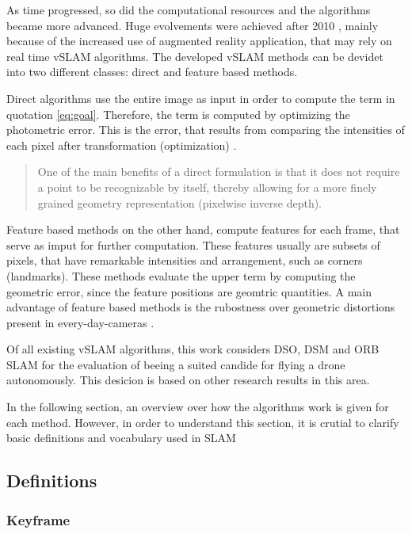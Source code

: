 As time progressed, so did the computational resources and the algorithms became more advanced. Huge evolvements were achieved after 2010 \cite{evolved}, mainly because of the increased
use of augmented reality application, that may rely on real time vSLAM algorithms. The developed vSLAM methods can be devidet into two different classes: direct and feature based methods.

Direct algorithms use the entire image as input in order to compute the term in quotation \ref{eq:goal}. Therefore, the term is computed by optimizing the photometric error. 
This is the error, that results from comparing the intensities of each pixel after transformation (optimization) \cite{dso}. 

  \begin{quote}
	One of the main benefits of a direct formulation is that it
	does not require a point to be recognizable by itself, thereby
	allowing for a more finely grained geometry representation (pixelwise inverse depth). \cite{dso}
  \end{quote}

Feature based methods on the other hand, compute features for each frame, that serve as imput for further computation. These features usually are subsets of pixels, that have remarkable 
intensities and arrangement, such as corners (landmarks). These methods evaluate the upper term by computing the geometric error, since the feature positions are geomtric 
quantities. A main advantage of feature based methods is the rubostness over geometric distortions present in every-day-cameras \cite{dso}. 

Of all existing vSLAM algorithms, this work considers DSO, DSM and ORB SLAM for the evaluation of beeing a suited candide for flying a drone autonomously. This desicion is based on 
other research results in this area. 



In the following section, an overview over how the algorithms work is given for each method. However, in order to understand this section, it is crutial to clarify basic definitions 
and vocabulary used in SLAM

	\subsection{Definitions}
		
		\subsubsection{Keyframe}
		
